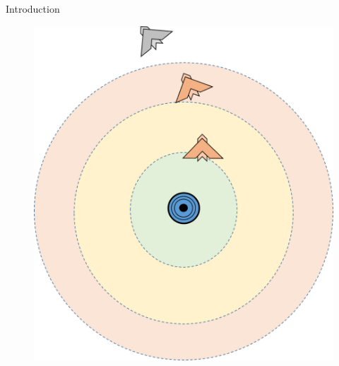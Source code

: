 
\begin{frame}{Introduction}{}
\begin{figure}[H]
\centerline{
\includegraphics[scale=0.35]{figures/intro.png}}
\label{fig:intro}
\end{figure}
\end{frame}

